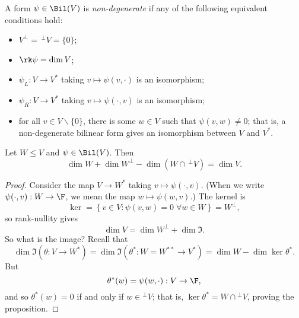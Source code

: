 \begin{definition}
	A form $\psi\in\Bil(V)$ is \emph{non-degenerate} if any of the following equivalent conditions hold: %
	\begin{itemize}
		\shortskip
		\item $V^\perp = \,^\perp V = \{0\}$;
		\item $\rk\psi=\dim V$;
		\item $\psi_L:V\to V^*$ taking $v\mapsto \psi(v,\cdot)$ is an isomorphism;
		\item $\psi_R:V\to V^*$ taking $v\mapsto \psi(\cdot,v)$ is an isomorphism;
		\item for all $v\in V\backslash\{0\}$, there is some $w\in V$ such that $\psi(v,w)\neq 0$; that is, a non-degenerate bilinear form gives an isomorphism between $V$ and $V^*$. %
	\end{itemize}
\end{definition}

	\pagebreak

\begin{proposition}
	Let $W\leq V$ and $\psi\in\Bil(V)$. Then %
	\begin{equation*}
		\dim W + \dim W^\perp - \dim(W\cap \,^\perp V) = \dim V.
	\end{equation*}
\end{proposition}

\begin{proof}
	Consider the map $V\to W^*$ taking $v\mapsto\psi(\cdot,v)$. (When we write $\psi(\cdot,v):W\to\F$, we mean the map $w\mapsto\psi(w,v)$.) The kernel is %
	\begin{equation*}
		\ker = \left\{v\in V : \psi(v,w)=0 \;\forall w\in W\right\} = W^\perp,
	\end{equation*}
	so rank-nullity gives
	\begin{equation*}
		\dim V = \dim W^\perp + \dim\Im.
	\end{equation*}
	So what is the image? Recall that
	\begin{equation*}
		\dim \Im(\theta:V\to W^*)
		= \dim\Im(\theta^*:W = W^{**} \to V^*)
		= \dim W - \dim\ker\theta^*.
	\end{equation*}
	But 
	\begin{equation*}
		\theta^*(w) = \psi(w,\cdot):V\to\F,
	\end{equation*}
	and so $\theta^*(w)=0$ if and only if $w\in{}^\perp V$; that is, $\ker\theta^* = W \cap {}^\perp V$, proving the proposition. %
\end{proof}

